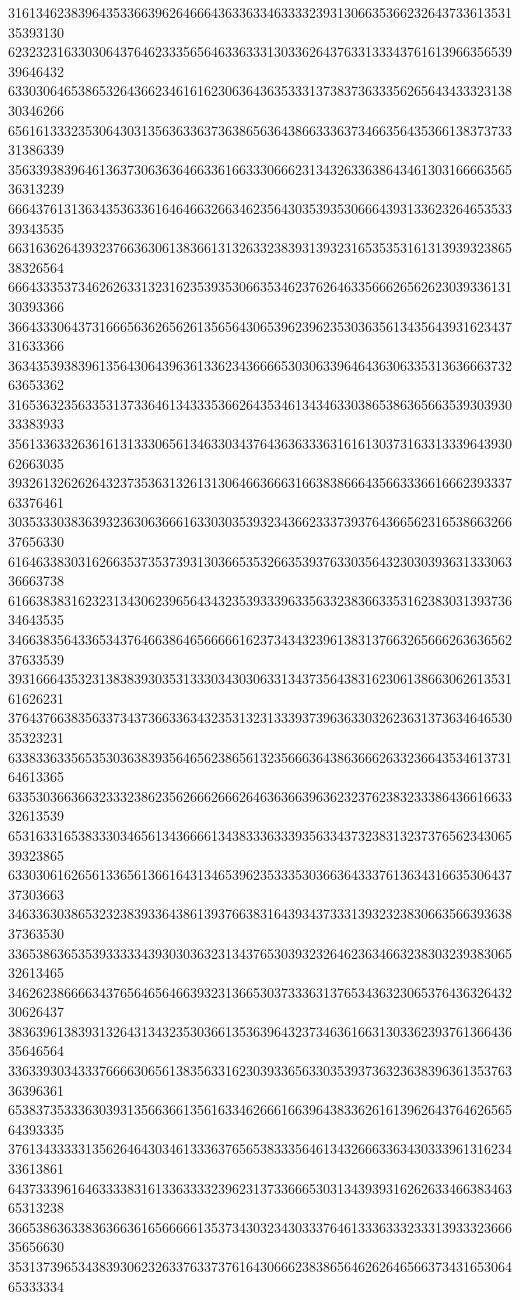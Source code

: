31613462383964353366396264666436336334633332393130663536623264373361353135393130
62323231633030643764623335656463363331303362643763313334376161396635653939646432
63303064653865326436623461616230636436353331373837363335626564343332313830346266
65616133323530643031356363363736386563643866333637346635643536613837373331386339
35633938396461363730636364663361663330666231343263363864346130316666356536313239
66643761313634353633616464663266346235643035393530666439313362326465353339343535
66316362643932376636306138366131326332383931393231653535316131393932386538326564
66643335373462626331323162353935306635346237626463356662656262303933613130393366
36643330643731666563626562613565643065396239623530363561343564393162343731633366
36343539383961356430643963613362343666653030633964643630633531363666373263653362
31653632356335313733646134333536626435346134346330386538636566353930393033383933
35613363326361613133306561346330343764363633363161613037316331333964393062663035
39326132626264323735363132613130646636663166383866643566333661666239333763376461
30353330383639323630636661633030353932343662333739376436656231653866326637656330
61646338303162663537353739313036653532663539376330356432303039363133306336663738
61663838316232313430623965643432353933396335633238366335316238303139373634643535
34663835643365343764663864656666616237343432396138313766326566626363656237633539
39316664353231383839303531333034303063313437356438316230613866306261353161626231
37643766383563373437366336343235313231333937396363303262363137363464653035323231
63383363356535303638393564656238656132356663643863666263323664353461373164613365
63353036636632333238623562666266626463636639636232376238323338643661663332613539
65316331653833303465613436666134383336333935633437323831323737656234306539323865
63303061626561336561366164313465396235333530366364333761363431663530643737303663
34633630386532323839336438613937663831643934373331393232383066356639363837363530
33653863653539333334393030363231343765303932326462363466323830323938306532613465
34626238666634376564656466393231366530373336313765343632306537643632643230626437
38363961383931326431343235303661353639643237346361663130336239376136643635646564
33633930343337666630656138356331623039336563303539373632363839636135376336396361
65383735333630393135663661356163346266616639643833626161396264376462656564393335
37613433333135626464303461333637656538333564613432666336343033396131623433613861
64373339616463333831613363333239623137336665303134393931626263346638346365313238
36653863633836366361656666613537343032343033376461333633323331393332366635656630
35313739653438393062326337633737616430666238386564626264656637343165306465333334
